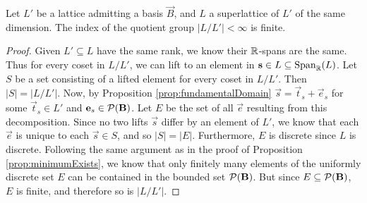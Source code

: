 \begin{proposition}\label{lem:FiniteQuotient} Let $L'$ be a lattice admitting a basis $\vec B$, and $L$ a superlattice of $L'$ of the same dimension. The index of the quotient group $|L / L'| < \infty$ is finite.
\end{proposition}
\begin{proof}
Given $L' \subseteq L$ have the same rank, we know their $\mathbb{R}$-spans are the same.
Thus for every coset in $L/L'$, we can lift to an element in $\mathbf{s} \in L \subseteq \operatorname{Span}_{\mathbb{R}}(L)$.
Let $S$ be a set consisting of a lifted element for every coset in $L / L'$.
Then $|S| = |L / L'|$.
Now, by Proposition \ref{prop:fundamentalDomain} $\vec s = \vec t_s + \vec e_s$ for some $\vec t_s \in L'$ and $\mathbf{e}_s \in \mathcal P (\mathbf{B})$.
Let $E$ be the set of all $\vec e$ resulting from this decomposition.
Since no two lifts $\vec s$ differ by an element of $L'$, we know that each $\vec e$ is unique to each $\vec s \in S$, and so $|S| = |E|$.
Furthermore, $E$ is discrete since $L$ is discrete.
Following the same argument as in the proof of Proposition \ref{prop:minimumExists}, we know that only finitely many elements of the uniformly discrete set $E$ can be contained in the bounded set $\mathcal P (\mathbf{B})$.
But since $E \subseteq \mathcal P (\mathbf{B})$, $E$ is finite, and therefore so is $|L/L'|$.
\end{proof}





